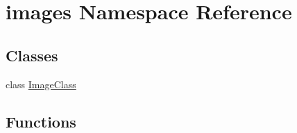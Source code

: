 \hypertarget{namespaceimages}{
\section{images Namespace Reference}
\label{namespaceimages}
}
\subsection*{Classes}
\begin{DoxyCompactItemize}
\item 
class \hyperlink{classimages_1_1ImageClass}{ImageClass}
\end{DoxyCompactItemize}
\subsection*{Functions}
